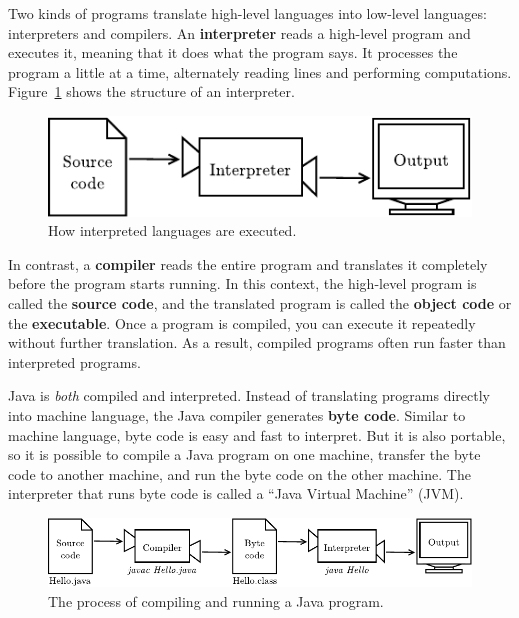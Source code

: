 \documentclass[12pt]{book}
\theoremstyle{exercise}
\begin{document}

Two kinds of programs translate high-level languages into low-level languages: interpreters and compilers.
An {\bf interpreter} reads a high-level program and executes it, meaning that it does what the program says.
It processes the program a little at a time, alternately reading lines and performing computations.
Figure~\ref{fig.interpreter} shows the structure of an interpreter.

\begin{figure}[!ht]
\begin{center}
\includegraphics{figs/interpreter.pdf}
\caption{How interpreted languages are executed.}
\label{fig.interpreter}
\end{center}
\end{figure}


In contrast, a {\bf compiler} reads the entire program and translates it completely before the program starts running.
In this context, the high-level program is called the {\bf source code}, and the translated program is called the {\bf object code} or the {\bf executable}.
Once a program is compiled, you can execute it repeatedly without further translation.
As a result, compiled programs often run faster than interpreted programs.


Java is {\em both} compiled and interpreted.
Instead of translating programs directly into machine language, the Java compiler generates {\bf byte code}.
Similar to machine language, byte code is easy and fast to interpret.
But it is also portable, so it is possible to compile a Java program on one machine, transfer the byte code to another machine, and run the byte code on the other machine.
The interpreter that runs byte code is called a ``Java Virtual Machine'' (JVM).

\begin{figure}[!ht]
\begin{center}
\includegraphics{figs/compiler.pdf}
\caption{The process of compiling and running a Java program.}
\label{fig.compiler}
\end{center}
\end{figure}
\end{document}
